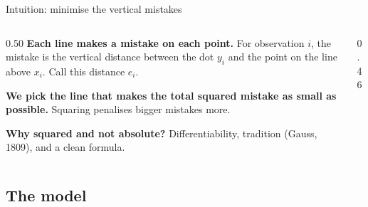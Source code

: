 \documentclass[aspectratio=169,11pt]{beamer}
\begin{document}
\begin{frame}{Intuition: minimise the vertical mistakes}
  \begin{columns}[T]
    \begin{column}{0.50\textwidth}
      \textbf{Each line makes a mistake on each point.}
      For observation $i$, the mistake is the vertical distance
      between the dot $y_i$ and the point on the line above $x_i$.
      Call this distance $e_i$.\par\medskip
      \textbf{We pick the line that makes the total squared
      mistake as small as possible.} Squaring penalises bigger
      mistakes more.\par\medskip
      \textbf{Why squared and not absolute?} Differentiability,
      tradition (Gauss, 1809), and a clean formula.
    \end{column}
    \begin{column}{0.46\textwidth}
    \end{column}
  \end{columns}
\end{frame}

\subsection{The model}
\end{document}
